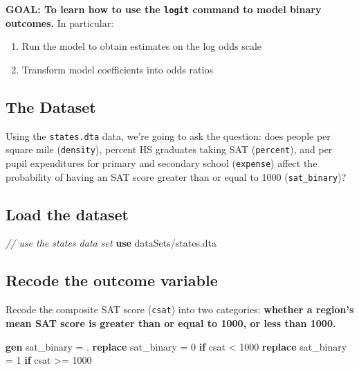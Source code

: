 \documentclass[
]{book}
\newenvironment{Shaded}{\begin{snugshade}}{\end{snugshade}}
\newcommand{\CommentTok}[1]{\textcolor[rgb]{0.56,0.35,0.01}{\textit{#1}}}
\newcommand{\KeywordTok}[1]{\textcolor[rgb]{0.13,0.29,0.53}{\textbf{#1}}}
\newcommand{\NormalTok}[1]{#1}
\providecommand{\tightlist}{%
  \setlength{\itemsep}{0pt}\setlength{\parskip}{0pt}}
\begin{document}
\begin{alert}

\textbf{GOAL: To learn how to use the \texttt{logit} command to model binary outcomes.} In particular:

\begin{enumerate}
\def\labelenumi{\arabic{enumi}.}
\tightlist
\item
  Run the model to obtain estimates on the log odds scale
\item
  Transform model coefficients into odds ratios
\end{enumerate}

\end{alert}

\hypertarget{the-dataset-1}{%
\subsection{The Dataset}\label{the-dataset-1}}

Using the \texttt{states.dta} data, we're going to ask the question: does people per square mile (\texttt{density}), percent HS graduates taking SAT (\texttt{percent}), and per pupil expenditures for primary and secondary school (\texttt{expense}) affect the probability of having an SAT score greater than or equal to 1000 (\texttt{sat\_binary})?

\hypertarget{load-the-dataset}{%
\subsection{Load the dataset}\label{load-the-dataset}}

\begin{Shaded}
\begin{Highlighting}[]
\CommentTok{// use the states data set}
\KeywordTok{use}\NormalTok{ dataSets/states.dta}
\end{Highlighting}
\end{Shaded}

\hypertarget{recode-the-outcome-variable}{%
\subsection{Recode the outcome variable}\label{recode-the-outcome-variable}}

Recode the composite SAT score (\texttt{csat}) into two categories: \textbf{whether a region's mean SAT score is greater than or equal to 1000, or less than 1000.}

\begin{Shaded}
\begin{Highlighting}[]
\KeywordTok{gen}\NormalTok{ sat\_binary = .}
\KeywordTok{replace}\NormalTok{ sat\_binary = 0 }\KeywordTok{if}\NormalTok{ csat \textless{} 1000}
\KeywordTok{replace}\NormalTok{ sat\_binary = 1 }\KeywordTok{if}\NormalTok{ csat \textgreater{}= 1000}
\end{Highlighting}
\end{Shaded}
\end{document}

